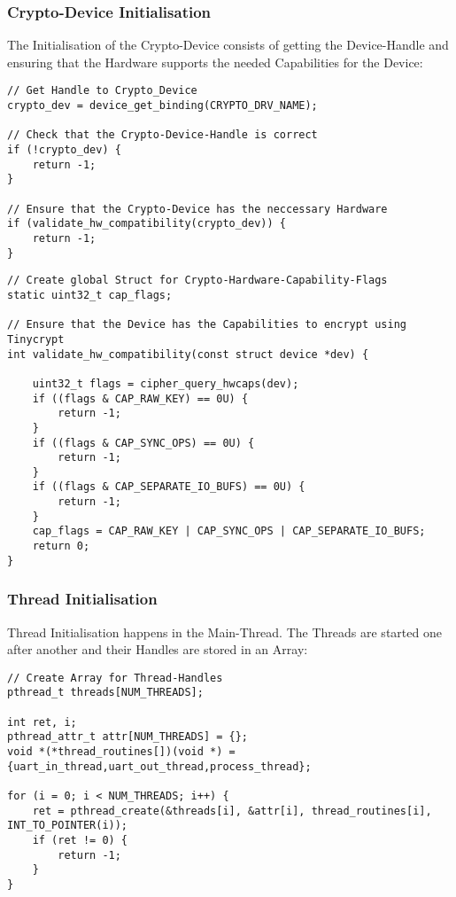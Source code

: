 \pagebreak

\subsubsection{Crypto-Device Initialisation}

The Initialisation of the Crypto-Device consists of getting the
Device-Handle and ensuring that the Hardware supports the
needed Capabilities for the Device:
\\
\begin{lstlisting}[style=CStyle,caption=Crypto-Device Initialisation]
// Get Handle to Crypto_Device
crypto_dev = device_get_binding(CRYPTO_DRV_NAME);

// Check that the Crypto-Device-Handle is correct
if (!crypto_dev) {
	return -1;
}

// Ensure that the Crypto-Device has the neccessary Hardware
if (validate_hw_compatibility(crypto_dev)) {
	return -1;
}
\end{lstlisting}

\begin{lstlisting}[style=CStyle,caption=Crypto Hardware Capability Check]
// Create global Struct for Crypto-Hardware-Capability-Flags
static uint32_t cap_flags;

// Ensure that the Device has the Capabilities to encrypt using Tinycrypt
int validate_hw_compatibility(const struct device *dev) {

    uint32_t flags = cipher_query_hwcaps(dev);
    if ((flags & CAP_RAW_KEY) == 0U) {
        return -1;
    }
    if ((flags & CAP_SYNC_OPS) == 0U) {
        return -1;
    }
    if ((flags & CAP_SEPARATE_IO_BUFS) == 0U) {
        return -1;
    }
    cap_flags = CAP_RAW_KEY | CAP_SYNC_OPS | CAP_SEPARATE_IO_BUFS;
	return 0;
}
\end{lstlisting}

\pagebreak

\subsubsection{Thread Initialisation}

Thread Initialisation happens in the Main-Thread.
The Threads are started one after another and their Handles are stored
in an Array:

\begin{lstlisting}[style=CStyle,caption=Thread Initialisation]
// Create Array for Thread-Handles
pthread_t threads[NUM_THREADS];

int ret, i;
pthread_attr_t attr[NUM_THREADS] = {};
void *(*thread_routines[])(void *) = {uart_in_thread,uart_out_thread,process_thread};

for (i = 0; i < NUM_THREADS; i++) {
	ret = pthread_create(&threads[i], &attr[i], thread_routines[i], INT_TO_POINTER(i));
	if (ret != 0) {
		return -1;
	}
}
\end{lstlisting}

